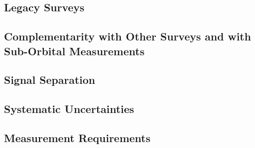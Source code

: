 \documentclass[11pt]{article}
\begin{document}

\subsection{Legacy Surveys} %






\subsection{Complementarity with Other Surveys and with Sub-Orbital Measurements} %




\subsection{Signal Separation}%
\label{sec:signal_separation}




\subsection{Systematic Uncertainties}%
\label{sec:systematics}



\subsection{Measurement Requirements} %
\label{requirements}


\newpage



%


\end{document}
